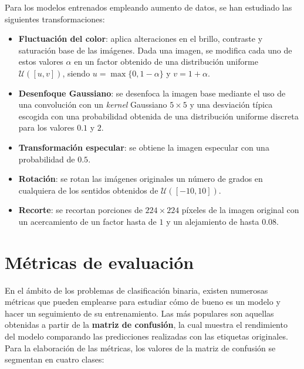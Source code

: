Para los modelos entrenados empleando aumento de datos, se han estudiado las siguientes transformaciones:

\begin{itemize}
	\item \textbf{Fluctuación del color}: aplica alteraciones en el brillo, contraste y saturación base de las imágenes. Dada una imagen, se modifica cada uno de estos valores $\alpha$ en un factor obtenido de una distribución uniforme $\mathcal{U}([u, v])$, siendo $u = \max\{0, 1 - \alpha\}$ y $v = 1 + \alpha$.
	\item \textbf{Desenfoque Gaussiano}: se desenfoca la imagen base mediante el uso de una convolución con un \textit{kernel} Gaussiano $5 \times 5$ y una desviación típica escogida con una probabilidad obtenida de una distribución uniforme discreta para los valores $0.1$ y $2$.
	\item \textbf{Transformación especular}: se obtiene la imagen especular con una probabilidad de $0.5$.
	\item \textbf{Rotación}: se rotan las imágenes originales un número de grados en cualquiera de los sentidos obtenidos de $\mathcal{U}([-10,10])$.
	\item \textbf{Recorte}: se recortan porciones de $224 \times 224$ píxeles de la imagen original con un acercamiento de un factor hasta de $1$ y un alejamiento de hasta $0.08$.
\end{itemize}

\section{Métricas de evaluación}

En el ámbito de los problemas de clasificación binaria, existen numerosas métricas que pueden emplearse para estudiar cómo de bueno es un modelo y hacer un seguimiento de su entrenamiento. Las más populares son aquellas obtenidas a partir de la \textbf{matriz de confusión}, la cual muestra el rendimiento del modelo comparando las predicciones realizadas con las etiquetas originales. Para la elaboración de las métricas, los valores de la matriz de confusión se segmentan en cuatro clases:

